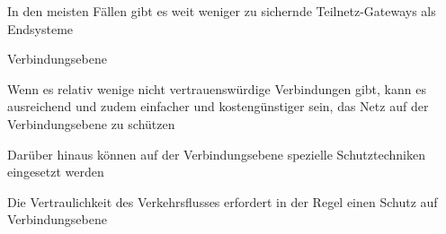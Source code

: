 \documentclass[a4paper]{article}
\begin{document}
\begin{multicols}{3}
\begin{itemize*}
\begin{itemize*}
                  \item In den meisten Fällen gibt es weit weniger zu sichernde Teilnetz-Gateways als Endsysteme
            \end{itemize*}
            \item Verbindungsebene
            \begin{itemize*}
                  \item Wenn es relativ wenige nicht vertrauenswürdige Verbindungen gibt, kann es ausreichend und zudem einfacher und kostengünstiger sein, das Netz auf der Verbindungsebene zu schützen
                  \item Darüber hinaus können auf der Verbindungsebene spezielle Schutztechniken eingesetzt werden %
                  \item Die Vertraulichkeit des Verkehrsflusses erfordert in der Regel einen Schutz auf Verbindungsebene
            \end{itemize*}
      \end{itemize*}


\end{multicols}
\end{document}
